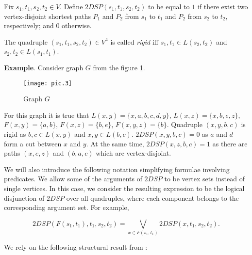 \begin{definition}
Fix $s_1, t_1, s_2, t_2 \in V$. Define $2DSP(s_1, t_1, s_2, t_2)$ to be equal to $1$ if there exist two vertex-disjoint shortest paths $P_1$ and $P_2$ from $s_1$ to $t_1$ and $P_2$ from $s_2$ to $t_2$, respectively; and $0$ otherwise.
\end{definition}

\begin{definition}
The quadruple $(s_1, t_1, s_2, t_2) \in V^4$ is called \textit{rigid} iff $s_1, t_1 \in L(s_2, t_2)$ and $s_2, t_2 \in L(s_1, t_1)$.
\end{definition}

\textbf{Example}. Consider graph $G$ from the figure \ref{pic:exmp}.

\begin{figure}[H]
\caption{Graph $G$}
\label{pic:exmp}
\centering
\texttt{[image: pic.3]}
\end{figure}

For this graph it is true that $L(x, y) = \{x, a, b, c, d, y\}$, $L(x, z) = \{x, b, e, z\}$, $F(x, y) = \{a, b\}$, $F(x, z) = \{b, e\}$, $F(x, y, z) = \{b\}$. Quadruple $(x, y, b, c)$ is rigid as $b, c \in L(x, y)$ and $x, y \in L(b, c)$. $2DSP(x, y, b, c) = 0$ as $a$ and $d$ form a cut between $x$ and $y$. At the same time, $2DSP(x, z, b, c) = 1$ as there are paths $(x, e, z)$ and $(b, a, c)$ which are vertex-disjoint.

We will also introduce the following notation simplifying formulae involving predicates. We allow some of the arguments of $2DSP$ to be vertex sets instead of single vertices. In this case, we consider the resulting expression to be the logical disjunction of $2DSP$ over all quadruples, where each component belongs to the corresponding argument set. For example,

\begin{equation}
2DSP(F(s_1, t_1), t_1, s_2, t_2) = \bigvee\limits_{x \in F(s_1, t_1)} 2DSP(x, t_1, s_2, t_2).
\end{equation}

We rely on the following structural result from \cite{ET}:

